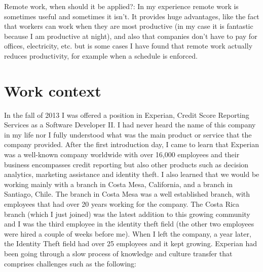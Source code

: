 \documentclass[12pt, letterpaper]{article}
\begin{document}
Remote work, when should it be applied?: In my experience remote work is sometimes useful and sometimes it isn't. It provides huge advantages, like the fact that workers can work when they are most productive (in my case it is fantastic because I am productive at night), and also that companies don't have to pay for offices, electricity, etc. but is some cases I have found that remote work actually reduces productivity, for example when a schedule is enforced.

 
\section{Work context}

In the fall of 2013 I was offered a position in Experian, Credit Score Reporting Services as a Software Developer II.
I had never heard the name of this company in my life nor I fully understood what was the main product or service that 
the company provided. 
After the first introduction day, I came to learn that Experian was a well-known company worldwide with over 16,000
employees and their business encompasses credit reporting but also other products such as decision 
analytics, marketing assistance and identity theft. I also learned that we would be working mainly with a branch in 
Costa Mesa, California, and a branch in Santiago, Chile. The branch in Costa Mesa was a well established branch, with 
employees that had over 20 years working for the company. The Costa Rica branch (which I just joined) was the 
latest addition to this growing 
community and I was the third employee in the identity theft field (the other two employees were hired a couple of 
weeks before me). When I left the company, a year later, the Identity Theft field had  over 25 employees and it 
kept growing. Experian had been going through a slow process of knowledge and culture transfer that comprises 
challenges such as the following:
\end{document}
